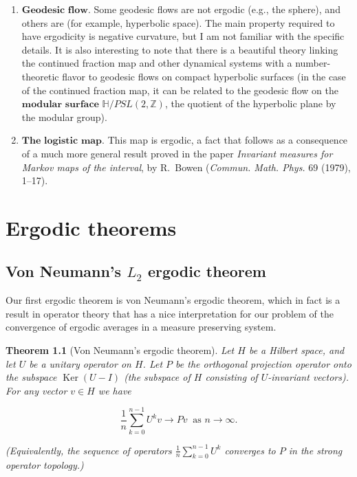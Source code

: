 \documentclass[11pt]{report}
\theoremstyle{plain}
\newtheorem{thm}{Theorem}[chapter]
\theoremstyle{definition}
\begin{document}
\begin{enumerate}[label=\arabic*.]
\item $\textbf{Geodesic flow.}$ Some geodesic flows are not ergodic (e.g., the sphere), and others are (for example, hyperbolic space). The main property required to have ergodicity is negative curvature, but I am not familiar with the specific details. It is also interesting to note that there is a beautiful theory linking the continued fraction map and other dynamical systems with a number-theoretic flavor to geodesic flows on compact hyperbolic surfaces (in the case of the continued fraction map, it can be related to the geodesic flow on the $\textbf{modular surface}$ $\mathbb{H}/PSL(2,\mathbb{Z})$, the quotient of the hyperbolic plane by the modular group).
\item $\textbf{The logistic map.}$ This map is ergodic, a fact that follows as a consequence of a much more general result proved in the paper \emph{Invariant measures for Markov maps of the interval}, by R.\ Bowen (\emph{Commun. Math. Phys.} 69 (1979), 1--17).
\end{enumerate}

\chapter{Ergodic theorems}

\section{Von Neumann's $L_2$ ergodic theorem}
Our first ergodic theorem is von Neumann's ergodic theorem, which in fact is a result in operator theory that has a nice interpretation for our problem of the convergence of ergodic averages in a measure preserving system.

\begin{thm}[Von Neumann's ergodic theorem]
\label{thm-vonneumann}
Let $H$ be a Hilbert space, and let $U$ be a unitary operator on $H$. Let $P$ be the orthogonal projection operator onto the subspace $\operatorname{Ker}(U-I)$ (the subspace of $H$ consisting of $U$-invariant vectors). For any vector $v\in H$ we have

\begin{equation*} \tag{17}\label{eq:vonneumann}
\frac{1}{n}\sum_{k=0}^{n-1} U^k v \to Pv \ \textrm{ as }n\to\infty.
\end{equation*}

(Equivalently, the sequence of operators $\frac{1}{n}\sum_{k=0}^{n-1} U^k$ converges to $P$ in the strong operator topology.)
\end{thm}
\end{document}
